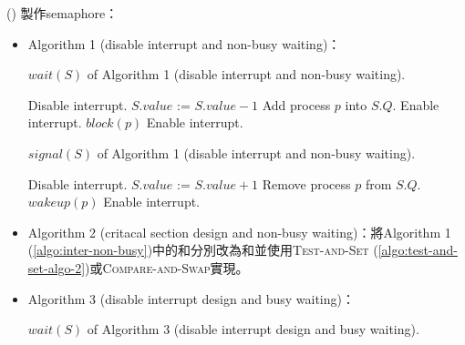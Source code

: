 \begin{theorem}{()} 製作semaphore：\begin{itemize}
        \item Algorithm 1 (disable interrupt and non-busy waiting)：\label{algo:inter-non-busy}
        \begin{algorithm}[H]
            \caption{$wait(S)$ of Algorithm 1 (disable interrupt and non-busy waiting).}
            \begin{algorithmic}[1]
                    \State Disable interrupt.
                    \State $S.value$ := $S.value - 1$
                        \State Add process $p$ into $S.Q$.
                        \State Enable interrupt.
                        \State $block(p)$ 
                    \Else 
                        \State Enable interrupt.
                    \EndIf
                \EndFunction
            \end{algorithmic}
        \end{algorithm}
        \begin{algorithm}[H]
            \caption{$signal(S)$ of Algorithm 1 (disable interrupt and non-busy waiting).}
            \begin{algorithmic}[1]
                    \State Disable interrupt.
                    \State $S.value$ := $S.value + 1$
                        \State Remove process $p$ from $S.Q$.
                        \State $wakeup(p)$ 
                    \EndIf
                    \State Enable interrupt.
                \EndFunction
            \end{algorithmic}
        \end{algorithm}
        \item Algorithm 2 (critacal section design and non-busy waiting)：\label{algo:cs-non-busy}將Algorithm 1 (\ref{algo:inter-non-busy})中的和分別改為和並使用\textsc{Test-and-Set} (\ref{algo:test-and-set-algo-2})或\textsc{Compare-and-Swap}實現。
        \item Algorithm 3 (disable interrupt design and busy waiting)：\label{algo:inter-busy}
        \begin{algorithm}[H]
            \caption{$wait(S)$ of Algorithm 3 (disable interrupt design and busy waiting).}
            \begin{algorithmic}[1]

\end{algorithmic}
\end{algorithm}
\end{itemize}
\end{theorem}
